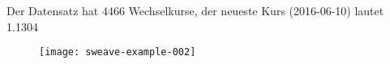 \documentclass[a5paper]{scrartcl}
\begin{document}
Der Datensatz hat 4466 Wechselkurse, der neueste Kurs
(2016-06-10) lautet 1.1304

\begin{figure}
\centering
\texttt{[image: sweave-example-002]}
\end{figure}
\end{document}
